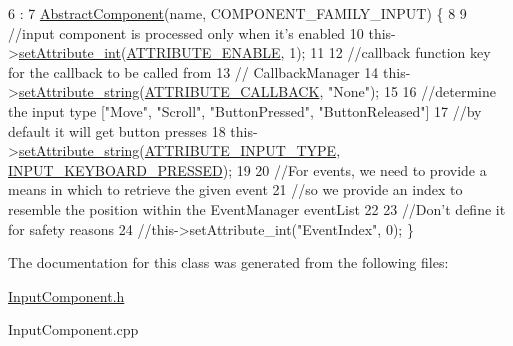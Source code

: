 \begin{DoxyCode}
6                                              :
7     \hyperlink{class_abstract_component_ab08b845eddbdbe411b95a5385501ab97}{AbstractComponent}(name, COMPONENT\_FAMILY\_INPUT) \{
8 
9     \textcolor{comment}{//input component is processed only when it's enabled}
10     this->\hyperlink{class_abstract_component_aca84c14d196467bda6aff90521b1ae7f}{setAttribute\_int}(\hyperlink{_a_e___attributes_8h_a4c775095baf8a9c99621ad9ad3b622db}{ATTRIBUTE\_ENABLE}, 1);
11 
12     \textcolor{comment}{//callback function key for the callback to be called from}
13     \textcolor{comment}{// CallbackManager}
14     this->\hyperlink{class_abstract_component_a702ec2cc2624561ef51afcd9c8061fd2}{setAttribute\_string}(\hyperlink{_a_e___attributes_8h_a8602d00b356bb7e6ba95069a94fd5555}{ATTRIBUTE\_CALLBACK}, \textcolor{stringliteral}{"None"});
15 
16     \textcolor{comment}{//determine the input type ["Move", "Scroll", "ButtonPressed", "ButtonReleased"]}
17     \textcolor{comment}{//by default it will get button presses}
18     this->\hyperlink{class_abstract_component_a702ec2cc2624561ef51afcd9c8061fd2}{setAttribute\_string}(\hyperlink{_a_e___attributes_8h_ac79ef953fa968e5d47da814b8d79263c}{ATTRIBUTE\_INPUT\_TYPE}, 
      \hyperlink{_a_e___events_8h_a7274317c7bc468f9f3a2acb0c3c1af9e}{INPUT\_KEYBOARD\_PRESSED});
19 
20     \textcolor{comment}{//For events, we need to provide a means in which to retrieve the given event}
21     \textcolor{comment}{//so we provide an index to resemble the position within the EventManager eventList}
22 
23     \textcolor{comment}{//Don't define it for safety reasons}
24     \textcolor{comment}{//this->setAttribute\_int("EventIndex", 0);}
\}
\end{DoxyCode}


The documentation for this class was generated from the following files\-:\begin{DoxyCompactItemize}
\item 
\hyperlink{_input_component_8h}{Input\-Component.\-h}\item 
Input\-Component.\-cpp\end{DoxyCompactItemize}
